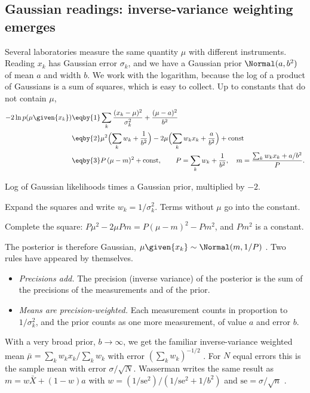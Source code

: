 \subsection{Gaussian readings: inverse-variance weighting emerges}

Several laboratories measure the same quantity $\mu$ with different instruments. Reading
$x_k$ has Gaussian error $\sigma_k$, and we have a Gaussian prior $\Normal(a,b^2)$ of
mean $a$ and width $b$. We work with the logarithm, because the log of a product of
Gaussians is a sum of squares, which is easy to collect. Up to constants that do not
contain $\mu$,
\begin{align}
  -2\ln p(\mu\given\{x_k\})
  &\eqby{1}\sum_k\frac{(x_k-\mu)^2}{\sigma_k^2}+\frac{(\mu-a)^2}{b^2}
   \nonumber\\
  &\eqby{2}\mu^2\Bigl(\sum_kw_k+\frac1{b^2}\Bigr)
     -2\mu\Bigl(\sum_kw_kx_k+\frac{a}{b^2}\Bigr)+\text{const}
   \nonumber\\
  &\eqby{3}P\,(\mu-m)^2+\text{const},\qquad
   P=\sum_kw_k+\frac1{b^2},\quad m=\frac{\sum_kw_kx_k+a/b^2}{P}.
  \label{5b:eq:normal-post}
\end{align}
\begin{explain}
  \item Log of Gaussian likelihoods times a Gaussian prior, multiplied by $-2$.
  \item Expand the squares and write $w_k=1/\sigma_k^2$. Terms without $\mu$ go into
        the constant.
  \item Complete the square: $P\mu^2-2\mu Pm=P(\mu-m)^2-Pm^2$, and $Pm^2$ is a constant.
\end{explain}
The posterior is therefore Gaussian, $\mu\given\{x_k\}\sim\Normal(m,1/P)$
. Two rules have appeared by themselves.
\begin{itemize}
  \item \emph{Precisions add.} The precision (inverse variance) of the posterior is
        the sum of the precisions of the measurements and of the prior.
  \item \emph{Means are precision-weighted.} Each measurement counts in proportion to
        $1/\sigma_k^2$, and the prior counts as one more measurement, of value $a$ and
        error $b$.
\end{itemize}
With a very broad prior, $b\to\infty$, we get the familiar inverse-variance weighted
mean $\bar\mu=\sum_kw_kx_k/\sum_kw_k$ with error $(\sum_kw_k)^{-1/2}$
. For $N$ equal errors this is the sample mean with error
$\sigma/\sqrt N$. Wasserman writes the same result as $m=w\bar X+(1-w)a$ with
$w=(1/\mathrm{se}^2)/(1/\mathrm{se}^2+1/b^2)$ and $\mathrm{se}=\sigma/\sqrt n$
.

